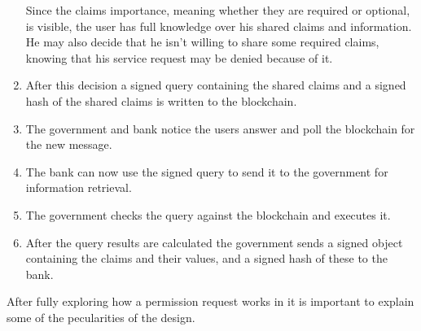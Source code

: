 \begin{enumerate}
Since the claims importance, meaning whether they are required or optional, is visible, the user has full knowledge over his shared claims and information.
He may also decide that he isn't willing to share some required claims, knowing that his service request may be denied because of it.
\item \label{permission_request_item_five}
After this decision a signed query containing the shared claims and a signed hash of the shared claims is written to the blockchain.
\item \label{permission_request_item_six}
The government and bank notice the users answer and poll the blockchain for the new message.
\item \label{permission_request_seven}
The bank can now use the signed query to send it to the government for information retrieval.
\item \label{permission_request_eight}
The government checks the query against the blockchain and executes it.
\item \label{permission_request_nine}
After the query results are calculated the government sends a signed object containing the claims and their values, and a signed hash of these to the bank.
\end{enumerate}
After fully exploring how a permission request works in \projectName{} it is important to explain some of the pecularities of the design.
